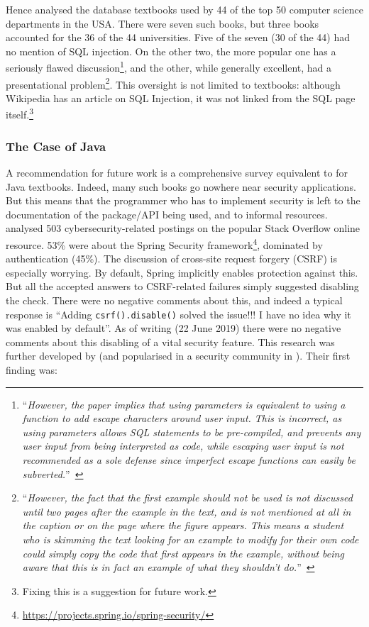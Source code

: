 \documentclass[conference]{IEEEtran}
\begin{document}
Hence \cite{Drop2019} analysed the database textbooks used by  44 of the top 50 computer science
departments in the USA. %
There were seven such books, but three books accounted for the 36 of the 44 universities. Five of the seven (30 of the 44) had no mention of SQL injection. On the other two, the more popular one has a seriously flawed discussion\footnote{``{\emph{However, the paper implies that using parameters is equivalent to using a function to add escape characters
around user input. This is incorrect, as using parameters allows
SQL statements to be pre-compiled, and prevents any user input
from being interpreted as code, while escaping user input is not
recommended as a sole defense since imperfect escape functions
can easily be subverted.}}''~\cite{Drop2019}}, and the other, while generally excellent, had a presentational problem\footnote{``{\emph{However, the fact that the first
example should not be used is not discussed until two pages after
the example in the text, and is not mentioned at all in the caption or
on the page where the figure appears. This means a student who is
skimming the text looking for an example to modify for their own
code could simply copy the code that first appears in the example,
without being aware that this is in fact an example of what they
shouldn't do.}}''~\cite{Drop2019}}.
This oversight is not limited to textbooks: although Wikipedia has an article on SQL Injection, it was not linked from the SQL page itself.\footnote{Fixing this is a suggestion for future work.}

\subsubsection{The Case of Java}\label{sec:Java}

A recommendation for future work is a comprehensive survey equivalent to \cite{Drop2019} for  Java textbooks. Indeed, many such books go nowhere near security applications.  But this means that the programmer who has to implement security is left to the documentation of the package/API being used, and to informal resources. \cite{Mengetal2018a} analysed 503 cybersecurity-related postings on the popular Stack Overflow online resource.  53\% were about the Spring Security framework\footnote{\url{https://projects.spring.io/spring-security/}}, dominated by authentication (45\%). The discussion \cite[\S4.3.1]{Mengetal2018a} of cross-site request forgery (CSRF) is especially worrying.  By default, Spring implicitly enables protection against this. But all the accepted answers to CSRF-related failures simply suggested disabling the check. There were no negative comments about this, and indeed a typical response is ``Adding \verb!csrf().disable()!
solved the issue!!! I have no idea why it was enabled by default''. As of writing (22 June 2019) there were no negative comments about this disabling of a vital security feature. This research was further developed by \cite{Chenetal2019a}  (and popularised in a security community in \cite{Zorz2019a}). Their first finding was:
\end{document}
